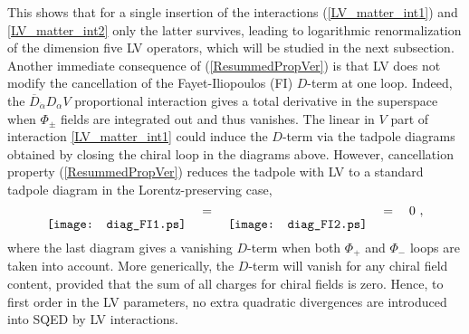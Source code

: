 \documentclass[12pt]{revtex4}
\begin{document}
%
This shows that for a single insertion of the interactions
(\ref{LV_matter_int1}) and \eqref{LV_matter_int2} only the latter
survives, leading to logarithmic renormalization of the dimension five
LV operators, which will be studied in the next subsection. 
Another immediate consequence of (\ref{ResummedPropVer}) is that LV
does not  modify the cancellation of the Fayet-Iliopoulos (FI)
$D$-term at one loop. Indeed, the 
$\overline{D}_{\dot\alpha}D_\alpha V$
proportional interaction gives a total derivative in the superspace
when $\Phi_{\pm}$ fields are integrated out and thus vanishes. 
The linear in $V$ part of interaction  \eqref{LV_matter_int1} could
induce the $D$-term via the tadpole diagrams obtained by closing the
chiral loop in the diagrams above. However, cancellation  property
(\ref{ResummedPropVer}) reduces the tadpole with LV to a standard 
tadpole diagram in the Lorentz-preserving case, 
%
\begin{equation}
\raisebox{-2.5ex}{\texttt{[image: diag\_FI1.ps]}}
\quad = \quad 
\raisebox{-2.5ex}{\texttt{[image: diag\_FI2.ps]}}
\quad = \quad 0~,
\end{equation}
%
where the last diagram gives a vanishing $D$-term when both $\Phi_+$
and $\Phi_-$ loops are taken into account. More generically, the
$D$-term will vanish for any chiral field content, provided that the
sum of all charges for chiral fields is zero. Hence, to first order in
the LV parameters, no extra quadratic divergences are introduced into
SQED by LV interactions. 
\end{document}
